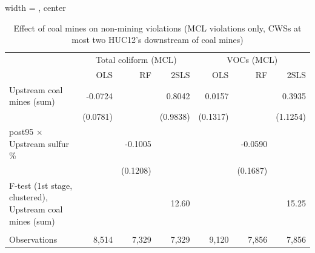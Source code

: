 
\begin{table}[htbp]
   
   \caption{\label{2sls_dwnstrm2step_nonminevio_mcl_ivsum} Effect of coal mines on non-mining violations (MCL violations only, CWSs at most two HUC12's downstream of coal mines)}
   \bigskip
   
   \centering
   
   \begin{adjustbox}{width = \textwidth, center}
      
      
      \begin{tabular}{lrrrrrr}
         \toprule
         
          & \multicolumn{3}{c}{Total coliform (MCL)} & \multicolumn{3}{c}{VOCs (MCL)}\\
         
                                                                  & OLS      & RF       & 2SLS     & OLS      & RF       & 2SLS\\  
         
         \midrule 
         Upstream coal mines (sum)                                & -0.0724  &          & 0.8042   & 0.0157   &          & 0.3935\\   
                                                                  & (0.0781) &          & (0.9838) & (0.1317) &          & (1.1254)\\   
         post95 $\times$ Upstream sulfur \%                       &          & -0.1005  &          &          & -0.0590  &   \\   
                                                                  &          & (0.1208) &          &          & (0.1687) &   \\   
         
         F-test (1st stage, clustered), Upstream coal mines (sum) &          &          & 12.60    &          &          & 15.25\\  
         
          \\
         
         Observations                                             & 8,514    & 7,329    & 7,329    & 9,120    & 7,856    & 7,856\\  
         
         \bottomrule
         
      \end{tabular}
      

\end{adjustbox}
\end{table}
